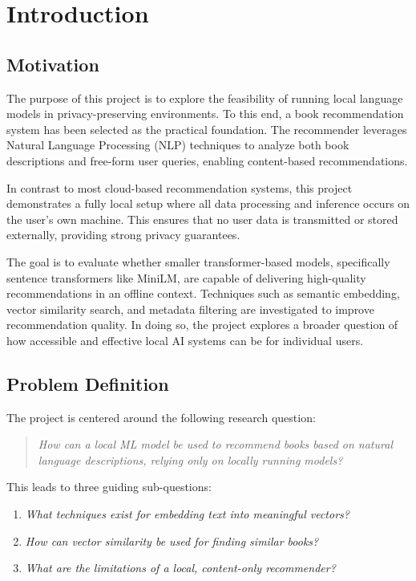 \chapter{Introduction}
\label{chapter:introduction}

\section{Motivation}
\label{sec:motivation}

The purpose of this project is to explore the feasibility of running local language models in privacy-preserving environments. To this end, a book recommendation system has been selected as the practical foundation. The recommender leverages Natural Language Processing (NLP) techniques to analyze both book descriptions and free-form user queries, enabling content-based recommendations.

In contrast to most cloud-based recommendation systems, this project demonstrates a fully local setup where all data processing and inference occurs on the user's own machine. This ensures that no user data is transmitted or stored externally, providing strong privacy guarantees.

The goal is to evaluate whether smaller transformer-based models, specifically sentence transformers like MiniLM, are capable of delivering high-quality recommendations in an offline context. Techniques such as semantic embedding, vector similarity search, and metadata filtering are investigated to improve recommendation quality. In doing so, the project explores a broader question of how accessible and effective local AI systems can be for individual users.

\section{Problem Definition}
\label{sec:problem-definition}

The project is centered around the following research question:

\begin{quote}
\textit{How can a local ML model be used to recommend books based on natural language descriptions, relying only on locally running models?}
\end{quote}
\label{itm:main-question}

This leads to three guiding sub-questions:

\begin{enumerate}
    \item \label{itm:subq-embedding} \textit{What techniques exist for embedding text into meaningful vectors?}
    \item \label{itm:subq-similarity} \textit{How can vector similarity be used for finding similar books?}
    \item \label{itm:subq-limitations} \textit{What are the limitations of a local, content-only recommender?}
\end{enumerate}


